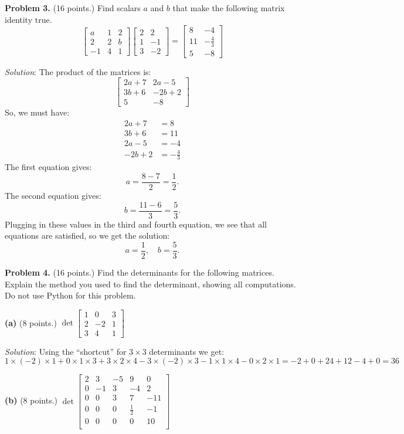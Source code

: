 \documentclass[12pt]{article}
\begin{document}
\textbf{Problem 3.} (16 points.) Find scalars $a$ and $b$ that make the following matrix identity true.
\[
\left[\begin{matrix}a & 1 & 2\\2 & 2 & b\\-1 & 4 & 1\end{matrix}\right]
\left[\begin{matrix}2 & 2\\1 & -1\\3 & -2\end{matrix}\right]=
\left[\begin{matrix}8 & -4\\11 & - \frac{4}{3}\\5 & -8\end{matrix}\right]
\] 

\emph{Solution}: The product of the matrices is:
\[
\left[\begin{matrix}2 a + 7 & 2 a - 5\\3 b + 6 & - 2 b + 2\\5 & -8\end{matrix}\right]
\]
So, we must have:
\begin{align*}
2 a + 7 &= 8\\
3 b + 6 &=11\\
2 a - 5 &=-4\\
- 2 b + 2 &= -\frac{4}{3}
\end{align*}
The first equation gives:
\[
a = \frac{8-7}{2}=\frac{1}{2}.
\]
The second equation gives:
\[
b = \frac{11-6}{3}=\frac{5}{3}.
\]
Plugging in these values in the third and fourth equation, we see that all equations are satisfied, so we get the solution:
\[
a =\frac{1}{2},\quad b=\frac{5}{3}.
\]
\proofend

\textbf{Problem 4.} (16 points.) Find the determinants for the following matrices. Explain the method you used to find the determinant, showing all computations. Do not use Python for this problem.

\textbf{(a)} (8 points.)
$
\det\begin{bmatrix}1&0&3\\2&-2&1\\3&4&1\end{bmatrix}
$

\emph{Solution}: Using the ``shortcut'' for $3\times3$ determinants we get:
\[
1\times(-2)\times 1 + 0\times 1 \times 3+ 3\times 2 \times 4 - 3\times(-2)\times3 - 1\times1\times4 -0\times2\times1= -2+0+24+12-4+0=36
\]
\proofend

\textbf{(b)} (8 points.)
$
\det\begin{bmatrix}
2&3&-5&9&0\\
0&-1&3&-4&2\\
0&0&3&7&-11\\
0&0&0&\frac{1}{2}&-1\\
0&0&0&0&10\\
\end{bmatrix} 
$
\end{document}

